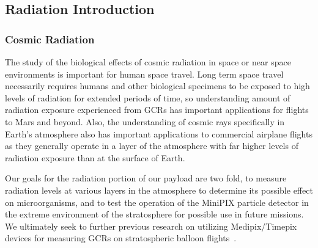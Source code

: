 \subsection{Radiation Introduction}
\label{sec: Radiation Background}

\subsubsection{Cosmic Radiation}
The study of the biological effects of cosmic radiation in space or near space environments is important for human space travel. Long term space travel necessarily requires humans and other biological specimens to be exposed to high levels of radiation for extended periods of time, so understanding amount of radiation exposure experienced from GCRs has important applications for flights to Mars and beyond. Also, the understanding of  cosmic rays specifically in Earth's atmosphere also has important applications to commercial airplane flights as they generally operate in a layer of the  atmosphere with far higher levels of radiation exposure than at the surface of Earth. 

Our goals for the radiation portion of our payload are two fold, to measure radiation levels at various layers in the atmosphere to determine its possible effect on microorganisms, and to test the operation of the MiniPIX particle detector in the extreme environment of the stratosphere for possible use in future missions. We ultimately seek to further previous research on utilizing Medipix/Timepix devices for measuring GCRs on stratospheric balloon flights~\cite{bexus}.
%
%




